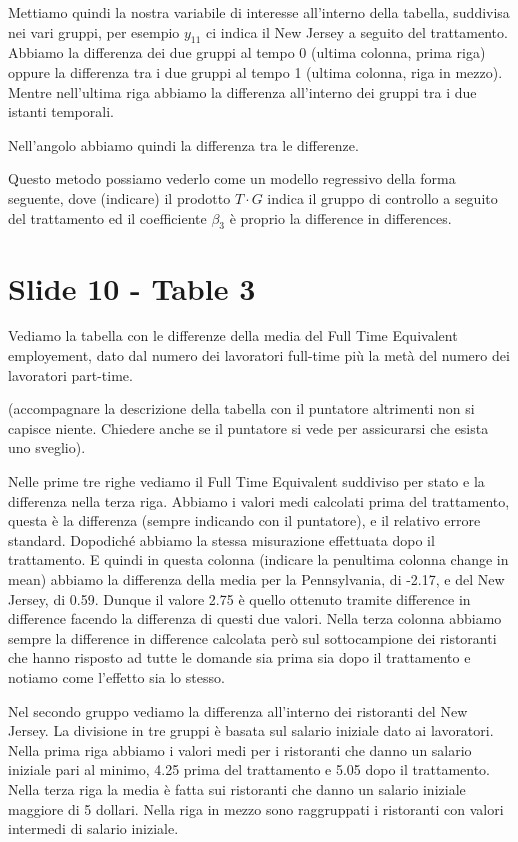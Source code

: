 \documentclass{article}
\begin{document}
Mettiamo quindi la nostra variabile di interesse all'interno della tabella, suddivisa nei vari gruppi, per esempio $y_{11}$ ci indica il New Jersey a seguito del trattamento.
Abbiamo la differenza dei due gruppi al tempo 0 (ultima colonna, prima riga) oppure la differenza tra i due gruppi al tempo 1 (ultima colonna, riga in mezzo). Mentre nell'ultima riga abbiamo la differenza all'interno dei gruppi tra i due istanti temporali.

Nell'angolo abbiamo quindi la differenza tra le differenze.

Questo metodo possiamo vederlo come un modello regressivo della forma seguente, dove (indicare) il prodotto $T \cdot G$ indica il gruppo di controllo a seguito del trattamento ed il coefficiente $\beta_3$ è proprio la difference in differences.


\section{Slide 10 - Table 3}

Vediamo  la tabella con le differenze della media del Full Time Equivalent employement, dato dal numero dei lavoratori full-time più la metà del numero dei lavoratori part-time.

(accompagnare la descrizione della tabella con il puntatore altrimenti non si capisce niente. Chiedere anche se il puntatore si vede per assicurarsi che esista uno sveglio).

Nelle prime tre righe vediamo il Full Time Equivalent suddiviso per stato e la differenza nella terza riga.  Abbiamo i valori medi calcolati prima del trattamento, questa è la differenza (sempre indicando con il puntatore), e il relativo errore standard. Dopodiché abbiamo la stessa misurazione effettuata dopo il trattamento. E quindi in questa colonna (indicare la penultima colonna change in mean)  abbiamo la differenza della media per la Pennsylvania, di -2.17, e del New Jersey, di 0.59. Dunque il valore 2.75 è quello ottenuto tramite difference in difference facendo la differenza di questi due valori. Nella terza colonna abbiamo sempre la difference in difference calcolata però sul sottocampione dei ristoranti che hanno risposto ad tutte le domande sia prima sia dopo il trattamento e notiamo come l'effetto sia lo stesso.

Nel secondo gruppo vediamo la differenza all'interno dei ristoranti del New Jersey. La divisione in tre gruppi è basata sul salario iniziale dato ai lavoratori. Nella prima riga abbiamo i valori medi per i ristoranti che danno un salario iniziale pari al minimo, 4.25 prima del trattamento e 5.05 dopo il trattamento. Nella terza riga la media è fatta sui ristoranti che danno un salario iniziale maggiore di 5 dollari. Nella riga in mezzo sono raggruppati i ristoranti con valori intermedi di salario iniziale.
\end{document}
